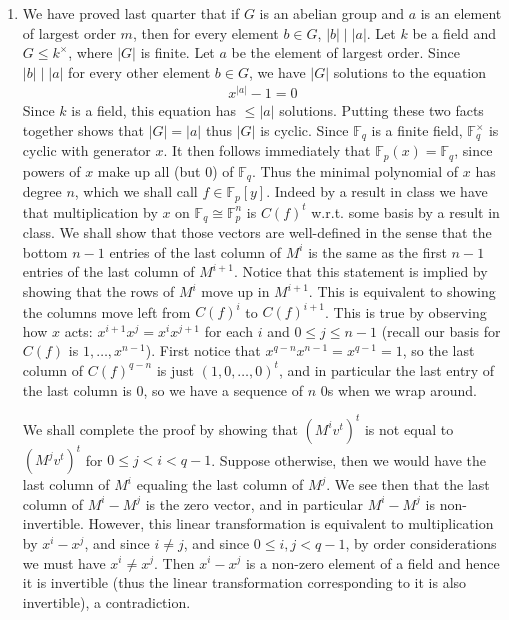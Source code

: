\documentclass[12pt]{article}
\theoremstyle{definitionstyle}
\def\mbb#1{\mathbb{#1}}
\newcommand{\F}{\mbb F}
\begin{document}
\begin{enumerate}
		\item We have proved last quarter that if $G$ is an abelian group and $a$ is an element of largest order $m$, then for every element $b \in G$, $|b| \mid |a|$. Let $k$ be a field and $G \leq k^\times$, where $|G|$ is finite. Let $a$ be the element of largest order. Since $|b| \mid |a|$ for every other element $b \in G$, we have $|G| $ solutions to the equation
		\begin{align*}
			x^{|a|} - 1 = 0
		\end{align*}
		Since $k$ is a field, this equation has $\leq |a|$ solutions. Putting these two facts together shows that $|G| = |a|$ thus $|G|$ is cyclic. Since $\F_q$ is a finite field, $\F_q^\times$ is cyclic with generator $x$. It then follows immediately that $\F_p(x) = \F_q$, since powers of $x$ make up all (but 0) of $\F_q$. Thus the minimal polynomial of $x$ has degree $n$, which we shall call $f \in \F_p[y]$. Indeed by a result in class we have that multiplication by $x$ on $\F_q \cong \F_p^n$ is $C(f)^t$ w.r.t. some basis by a result in class. We shall show that those vectors are well-defined in the sense that the bottom $n-1$ entries of the last column of $M^i$ is the same as the first $n-1$ entries of the last column of $M^{i+1}$. Notice that this statement is implied by showing that the rows of $M^i$ move up in $M^{i+1}$. This is equivalent to showing the columns move left from $C(f)^i$ to $C(f)^{i+1}$. This is true by observing how $x$ acts: $x^{i+1} x^j = x^{i} x^{j+1}$ for each $i$ and $0 \leq j \leq n-1$ (recall our basis for $C(f)$ is $1, \ldots, x^{n-1}$). First notice that $x^{q-n}x^{n-1} = x^{q-1} = 1$, so the last column of $C(f)^{q-n}$ is just $(1,0, \ldots, 0)^t$, and in particular the last entry of the last column is 0, so we have a sequence of $n$ 0s when we wrap around. 
		
		We shall complete the proof by showing that $(M^iv^t)^t$ is not equal to $(M^jv^t)^t$ for $0 \leq j < i < q-1$. Suppose otherwise, then we would have the last column of $M^i$ equaling the last column of $M^j$. We see then that the last column of $M^i - M^j$ is the zero vector, and in particular $M^i - M^j$ is non-invertible. However, this linear transformation is equivalent to multiplication by $x^i - x^j$, and since $i \neq j$, and since $0 \leq i,j<q-1$, by order considerations we must have $x^i \neq x^j$. Then $x^i - x^j$ is a non-zero element of a field and hence it is invertible (thus the linear transformation corresponding to it is also invertible), a contradiction. 
		

\end{enumerate}
\end{document}
